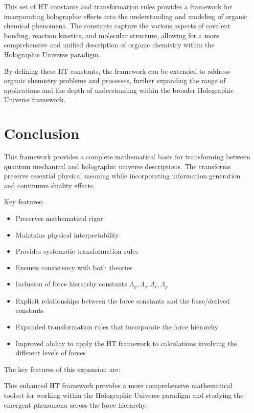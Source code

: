 \documentclass{article}
\theoremstyle{plain}
\theoremstyle{definition}
\theoremstyle{remark}
\begin{document}
This set of HT constants and transformation rules provides a framework for incorporating holographic effects into the understanding and modeling of organic chemical phenomena. The constants capture the various aspects of covalent bonding, reaction kinetics, and molecular structure, allowing for a more comprehensive and unified description of organic chemistry within the Holographic Universe paradigm.

By defining these HT constants, the framework can be extended to address organic chemistry problems and processes, further expanding the range of applications and the depth of understanding within the broader Holographic Universe framework.
\section{Conclusion}

This framework provides a complete mathematical basis for transforming between quantum mechanical and holographic universe descriptions. The transforms preserve essential physical meaning while incorporating information generation and continuum duality effects.

Key features:
\begin{itemize}
\item Preserves mathematical rigor
\item Maintains physical interpretability
\item Provides systematic transformation rules
\item Ensures consistency with both theories
\item Inclusion of force hierarchy constants $\Lambda_g, \Lambda_q, \Lambda_c, \Lambda_p$
\item Explicit relationships between the force constants and the base/derived constants
\item Expanded transformation rules that incorporate the force hierarchy
\item Improved ability to apply the HT framework to calculations involving the different levels of forces
\end{itemize}

The key features of this expansion are:


This enhanced HT framework provides a more comprehensive mathematical toolset for working within the Holographic Universe paradigm and studying the emergent phenomena across the force hierarchy.
\end{document}

